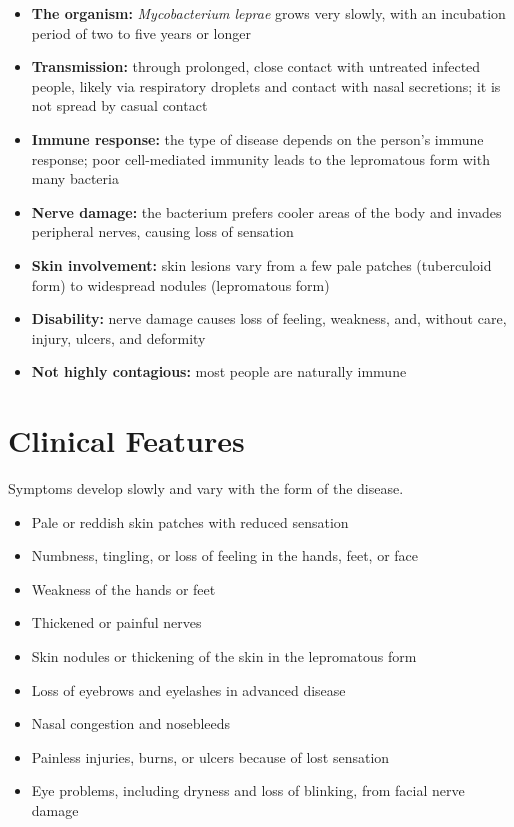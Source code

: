 \begin{itemize}
    \item \textbf{The organism:} \textit{Mycobacterium leprae} grows very slowly, with an incubation period of two to five years or longer
    \item \textbf{Transmission:} through prolonged, close contact with untreated infected people, likely via respiratory droplets and contact with nasal secretions; it is not spread by casual contact
    \item \textbf{Immune response:} the type of disease depends on the person's immune response; poor cell-mediated immunity leads to the lepromatous form with many bacteria
    \item \textbf{Nerve damage:} the bacterium prefers cooler areas of the body and invades peripheral nerves, causing loss of sensation
    \item \textbf{Skin involvement:} skin lesions vary from a few pale patches (tuberculoid form) to widespread nodules (lepromatous form)
    \item \textbf{Disability:} nerve damage causes loss of feeling, weakness, and, without care, injury, ulcers, and deformity
    \item \textbf{Not highly contagious:} most people are naturally immune
\end{itemize}

\section*{Clinical Features}
Symptoms develop slowly and vary with the form of the disease.

\begin{itemize}
    \item Pale or reddish skin patches with reduced sensation
    \item Numbness, tingling, or loss of feeling in the hands, feet, or face
    \item Weakness of the hands or feet
    \item Thickened or painful nerves
    \item Skin nodules or thickening of the skin in the lepromatous form
    \item Loss of eyebrows and eyelashes in advanced disease
    \item Nasal congestion and nosebleeds
    \item Painless injuries, burns, or ulcers because of lost sensation
    \item Eye problems, including dryness and loss of blinking, from facial nerve damage
\end{itemize}

